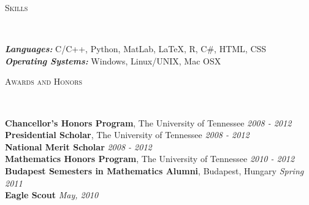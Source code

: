 \documentclass[9pt]{article}
\newenvironment{changemargin}[2]{%
  \begin{list}{}{%
    \setlength{\topsep}{0pt}%
    \setlength{\leftmargin}{#1}%
    \setlength{\rightmargin}{#2}%
    \setlength{\listparindent}{\parindent}%
    \setlength{\itemindent}{\parindent}%
    \setlength{\parsep}{\parskip}%
  }%
  \item[]}{\end{list}
}
\newcommand{\lineover}{
	\begin{changemargin}{-0.05in}{-0.05in}
		\vspace*{-8pt}
		\hrulefill \\
		\vspace*{-2pt}
	\end{changemargin}
}
\newcommand{\header}[1]{
	\begin{changemargin}{-0.5in}{-0.5in}
		\scshape{#1}\\
  	\lineover
	\end{changemargin}
}
\newenvironment{body} {
	\vspace*{-16pt}
	\begin{changemargin}{-0.25in}{-0.5in}
  }	
	{\end{changemargin}
}
\begin{document}
{\begin{body}
\end{body}

\smallskip



\header{Skills}

\begin{body}
	\vspace{14pt}
	\emph{\textbf{Languages:}}{} C/C++, Python, MatLab, \LaTeX , R, C\#, HTML, CSS\\
	\medskip
	\emph{\textbf{Operating Systems:}}{} Windows, Linux/UNIX, Mac OSX\\
	\medskip
\end{body}

\smallskip


\header{Awards and Honors}

\begin{body}
	\vspace{14pt}
	\textbf{Chancellor's Honors Program}, The University of Tennessee \hfill{} \emph{2008 - 2012}\\
	\smallskip
	\textbf{Presidential Scholar}, The University of Tennessee \hfill{} \emph{2008 - 2012} \\
	\smallskip
	\textbf{National Merit Scholar} \hfill{} \emph{2008 - 2012} \\
	\smallskip
	\textbf{Mathematics Honors Program}, The University of Tennessee \hfill{} \emph{2010 - 2012} \\
	\smallskip
	\textbf{Budapest Semesters in Mathematics Alumni}, Budapest, Hungary \hfill{} \emph{Spring 2011} \\
	\smallskip
	\textbf{Eagle Scout} \hfill{} \emph{May, 2010}
\end{body}
\end{document}
